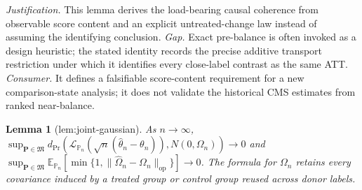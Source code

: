 \documentclass{article}
\newtheorem{lemma}{Lemma}
\begin{document}
\par\smallskip\noindent \textit{Justification.} This lemma derives the load-bearing causal coherence from observable score content and an explicit untreated-change law instead of assuming the identifying conclusion. \textit{Gap.} Exact pre-balance is often invoked as a design heuristic; the stated identity records the precise additive transport restriction under which it identifies every close-label contrast as the same ATT. \textit{Consumer.} It defines a falsifiable score-content requirement for a new comparison-state analysis; it does not validate the historical CMS estimates from ranked near-balance.

\begin{lemma}[lem:joint-gaussian]\label{lem:joint-gaussian}
As \(n\to\infty\), \(\sup_{\mathbf P\in\mathfrak M}d_{\mathrm{Pr}}(\mathcal L_{\mathbb P_n}(\sqrt n(\widehat\theta_n-\theta_n)),N(0,\Omega_n))\to0\) and \(\sup_{\mathbf P\in\mathfrak M}\mathbb E_{\mathbb P_n}[\min\{1,\|\widehat\Omega_n-\Omega_n\|_{\mathrm{op}}\}]\to0\). The formula for \(\Omega_n\) retains every covariance induced by a treated group or control group reused across donor labels.
\end{lemma}
\end{document}
